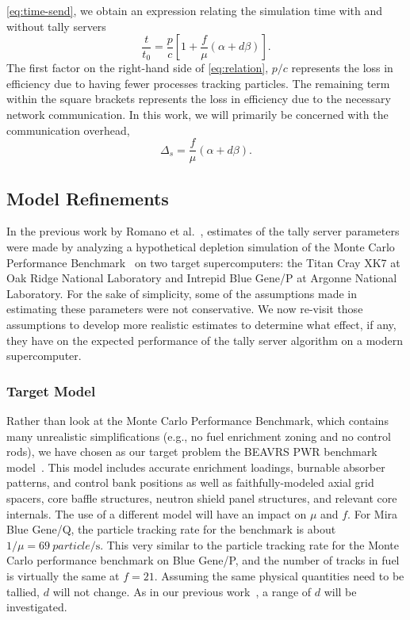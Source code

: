 \documentclass{snamc2013}
\begin{document}
\autoref{eq:time-send}, we obtain an expression relating the simulation time with
and without tally servers
\begin{equation}
  \label{eq:relation}
  \frac{t}{t_0} = \frac{p}{c} \left [ 1 + \frac{f}{\mu} \left ( \alpha + d\beta
  \right ) \right ].
\end{equation}
The first factor on the right-hand side of \autoref{eq:relation}, $p/c$
represents the loss in efficiency due to having fewer processes tracking
particles. The remaining term within the square brackets represents the loss in
efficiency due to the necessary network communication. In this work, we will
primarily be concerned with the communication overhead,
\begin{equation}
  \label{eq:overhead}
  \Delta_s = \frac{f}{\mu} \left ( \alpha + d\beta \right ).
\end{equation}

\subsection{Model Refinements}

In the previous work by Romano et al.~\cite{jcp-romano-2013}, estimates of the
tally server parameters were made by analyzing a hypothetical depletion
simulation of the Monte Carlo Performance Benchmark~\cite{mc-hoogenboom-2011} on
two target supercomputers: the Titan Cray XK7 at Oak Ridge National Laboratory
and Intrepid Blue Gene/P at Argonne National Laboratory. For the sake of
simplicity, some of the assumptions made in estimating these parameters were not
conservative. We now re-visit those assumptions to develop more realistic
estimates to determine what effect, if any, they have on the expected
performance of the tally server algorithm on a modern supercomputer.

\subsubsection{Target Model}

Rather than look at the Monte Carlo Performance Benchmark, which contains many
unrealistic simplifications (e.g., no fuel enrichment zoning and no control
rods), we have chosen as our target problem the BEAVRS PWR benchmark
model~\cite{mc-horelik-2013}. This model includes accurate enrichment loadings,
burnable absorber patterns, and control bank positions as well as
faithfully-modeled axial grid spacers, core baffle structures, neutron shield
panel structures, and relevant core internals. The use of a different model will
have an impact on $\mu$ and $f$. For Mira Blue Gene/Q, the particle tracking
rate for the benchmark is about $1/\mu = \SI{69}{particle/\second}$. This
very similar to the particle tracking rate for the Monte Carlo performance
benchmark on Blue Gene/P, and the number of tracks in fuel is virtually the same
at $f = 21$. Assuming the same physical quantities need to be tallied, $d$ will
not change. As in our previous work~\cite{jcp-romano-2013}, a range of $d$ will
be investigated.
\end{document}
